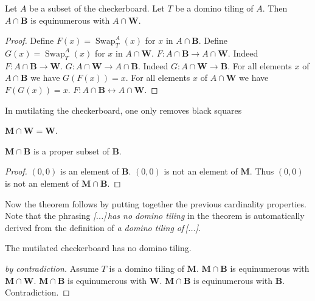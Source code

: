 \documentclass{article}
\newcommand{\Mutilated}{\mathbf{M}}
\newcommand{\Black}{\mathbf{B}}
\newcommand{\White}{\mathbf{W}}
\newcommand{\Sw}[3]{\operatorname{Swap}_{#1}^{#2}(#3)}
\begin{document}
\begin{forthel}
    \begin{lemma}
        Let $A$ be a subset of the checkerboard.
        Let $T$ be a domino tiling of $A$.
        Then $A \cap \Black$ is
        equinumerous with $A \cap \White$.
    \end{lemma}
    \begin{proof}
        Define $F(x) = \Sw{T}{A}{x}$ for $x$ in $A \cap \Black$.
        Define $G(x) = \Sw{T}{A}{x}$ for $x$ in $A \cap \White$.
        $F: A \cap \Black \to A \cap \White$.
        Indeed  $F: A \cap \Black \to \White$.
        $G: A \cap \White \to A \cap \Black$.
        Indeed  $G: A \cap \White \to \Black$.
        For all elements $x$ of $A \cap \Black$ we have $G(F(x))=x$.
        For all elements $x$ of $A \cap \White$ we have $F(G(x))=x$.
        $F : A \cap \Black \leftrightarrow A \cap \White$.
    \end{proof}
\end{forthel}

\noindent In mutilating the checkerboard, one only removes black squares

\begin{forthel}
  \begin{lemma}
      $\Mutilated \cap \White = \White$.
  \end{lemma}

\begin{lemma}
    $\Mutilated\cap\Black$ is a proper subset of $\Black$.
\end{lemma}
\begin{proof}
    $(0,0)$ is an element of $\Black$.
    $(0,0)$ is not an element of $\Mutilated$.
    Thus $(0,0)$ is not an element of $\Mutilated\cap \Black$.
\end{proof}
\end{forthel}

\noindent Now the theorem follows by putting together the previous cardinality properties.
Note that the phrasing \textit{[...]\,has no domino tiling} in the theorem is automatically
derived from the definition of \textit{a domino tiling of\,[...]}.

\begin{forthel}
    \begin{theorem}
        The mutilated checkerboard has no domino tiling.
    \end{theorem}
    \begin{proof}[by contradiction]
        Assume $T$ is a domino tiling of $\Mutilated$.
        $\Mutilated \cap \Black$ is equinumerous with $\Mutilated \cap \White$.
        $\Mutilated \cap \Black$ is equinumerous with $\White$.
        $\Mutilated \cap \Black$ is equinumerous with $\Black$.
        Contradiction.
    \end{proof}
\end{forthel}
\end{document}
